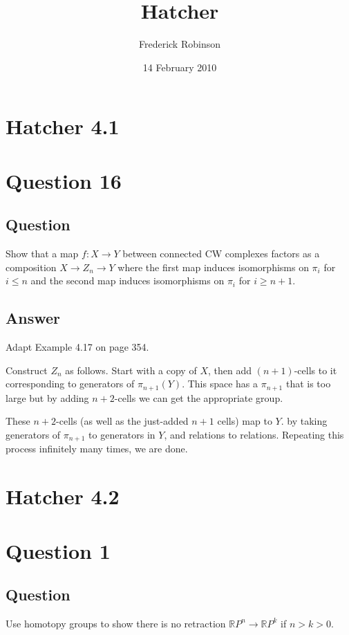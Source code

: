 \documentclass[11pt]{article}
\begin{document}



\title{Hatcher}
\author{Frederick Robinson}
\date{14 February 2010}
\maketitle


\section*{Hatcher 4.1}
\section{Question 16}
\subsection{Question}
Show that a map $f : X \to Y$ between connected CW complexes factors as a composition $X \to Z_n \to Y$ where the first map induces isomorphisms on $\pi_i$ for $i \leq n$ and the second map induces isomorphisms on $\pi_i$ for $i \geq n +1$.
\subsection{Answer}

Adapt Example 4.17 on page 354. 

Construct $Z_n$ as follows. Start with a copy of $X$, then add $(n+1)$-cells to it corresponding to generators of $\pi_{n+1}(Y)$.  This space has a $\pi_{n+1}$ that is too large but by adding $n+2$-cells we can get the appropriate group.

 These $n+2$-cells (as well as the just-added $n+1$ cells) map to $Y$. by taking generators of $\pi_{n+1}$ to generators in $Y$, and relations to relations.   Repeating this process infinitely many times, we are done.
\section*{Hatcher 4.2}

\section{Question 1}
\subsection{Question}Use homotopy groups to show there is no retraction $\mathbb{R}P^n \to \mathbb{R}P^k$ if $n>k>0$.
\end{document}

